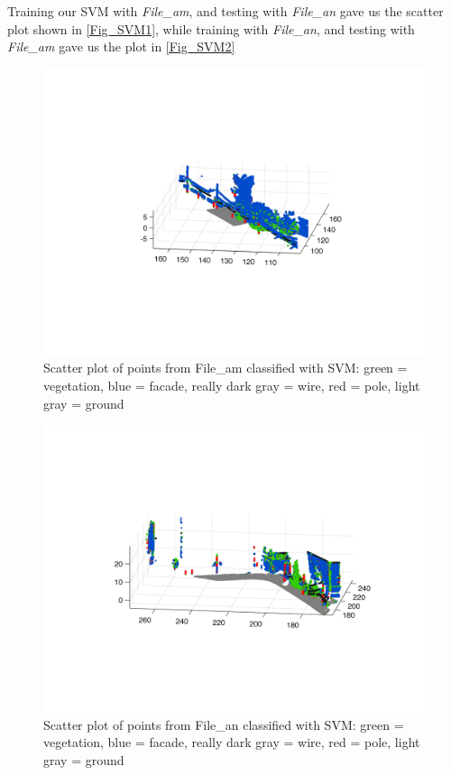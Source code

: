 \documentclass[letterpaper]{article}
\begin{document}
Training our SVM with \textit{File\_am}, and testing with
\textit{File\_an} gave us the scatter plot shown in \ref{Fig_SVM1},
while training with \textit{File\_an}, and testing with
\textit{File\_am} gave us the plot in \ref{Fig_SVM2}
\begin{figure}[t]
\includegraphics[width=.8\linewidth]{plotSVMQ1_1.jpg}
\caption{Scatter plot of points from File\_am classified with SVM: green = vegetation, blue = facade, really dark gray = wire, red = pole, light gray = ground}
\label{Fig_Ada1}
\end{figure}
\begin{figure}[t]
\includegraphics[width=.8\linewidth]{plotSVMQ1_2.jpg}
\caption{Scatter plot of points from File\_an classified with SVM: green = vegetation, blue = facade, really dark gray = wire, red = pole, light gray = ground}
\label{Fig_Ada2}
\end{figure}
\end{document}

